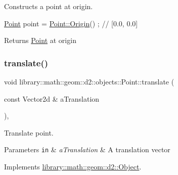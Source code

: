 Constructs a point at origin. 


\begin{DoxyCode}
\hyperlink{classlibrary_1_1math_1_1geom_1_1d2_1_1objects_1_1_point_a4998aefdf80bdfd967f21d49fa050398}{Point} point = \hyperlink{classlibrary_1_1math_1_1geom_1_1d2_1_1objects_1_1_point_ac372ec5b87ab91d58dc515eda2f0fa75}{Point::Origin}() ; \textcolor{comment}{// [0.0, 0.0]}
\end{DoxyCode}


\begin{DoxyReturn}{Returns}
\hyperlink{classlibrary_1_1math_1_1geom_1_1d2_1_1objects_1_1_point}{Point} at origin 
\end{DoxyReturn}
\mbox{\label{classlibrary_1_1math_1_1geom_1_1d2_1_1objects_1_1_point_a8e17705a1762fdfdcbed68881afca245}} 
\subsubsection{\texorpdfstring{translate()}{translate()}}
{\footnotesize\ttfamily void library\+::math\+::geom\+::d2\+::objects\+::\+Point\+::translate (\begin{DoxyParamCaption}\item[{const Vector2d \&}]{a\+Translation }\end{DoxyParamCaption})\hspace{0.3cm}{\ttfamily [override]}, {\ttfamily [virtual]}}



Translate point. 


\begin{DoxyParams}[1]{Parameters}
\mbox{\tt in}  & {\em a\+Translation} & A translation vector \\
\hline
\end{DoxyParams}


Implements \hyperlink{classlibrary_1_1math_1_1geom_1_1d2_1_1_object_a00a8bec981c21c0298af86c495fe4341}{library\+::math\+::geom\+::d2\+::\+Object}.

\mbox{\label{classlibrary_1_1math_1_1geom_1_1d2_1_1objects_1_1_point_a110a5bba9399abc5408f6c34306040c6}} 

